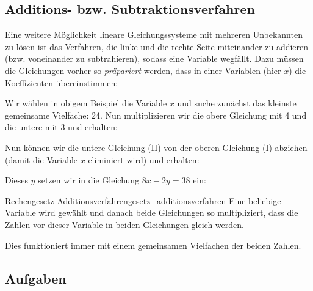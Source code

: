 
\subsection{Additions- bzw. Subtraktionsverfahren}
Eine weitere Möglichkeit lineare Gleichungssysteme mit mehreren Unbekannten zu lösen ist das Verfahren, die linke und die rechte Seite miteinander zu addieren (bzw. voneinander zu subtrahieren), sodass eine Variable wegfällt. Dazu müssen die Gleichungen vorher so \textit{präpariert} werden, dass in einer Variablen (hier \zB $x$) die Koeffizienten übereinstimmen:


Wir wählen \zB in obigem Beispiel die Variable $x$ und suche zunächst
das kleinste gemeinsame Vielfache: 24. Nun multiplizieren wir die obere
Gleichung mit 4 und die untere mit 3 und erhalten:



Nun können wir die untere Gleichung (II) von der oberen Gleichung (I) abziehen (damit die Variable $x$ eliminiert wird)
und erhalten:
  


  Dieses $y$ setzen wir \zB in die Gleichung $8x-2y=38$ ein:
\newpage


  \begin{rezept}{Rechengesetz Additionsverfahren}{gesetz_additionsverfahren}
    Eine beliebige Variable wird gewählt und danach beide Gleichungen so multipliziert,
    dass die Zahlen vor dieser Variable in beiden Gleichungen gleich werden.

    Dies funktioniert
    immer mit einem gemeinsamen Vielfachen der beiden Zahlen.
  \end{rezept}

\subsection*{Aufgaben}

\newpage
